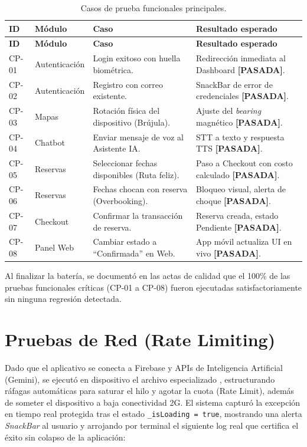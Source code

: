 \documentclass[12pt,letterpaper]{report}
\newcommand{\pathtext}[1]{\texttt{\detokenize{#1}}}
\begin{document}
\begin{longtable}{p{1.5cm}p{3.2cm}p{4.8cm}p{4.8cm}}
\caption{Casos de prueba funcionales principales.}\\
\toprule
\textbf{ID} & \textbf{Módulo} & \textbf{Caso} & \textbf{Resultado esperado}\\
\midrule
\endfirsthead
\toprule
\textbf{ID} & \textbf{Módulo} & \textbf{Caso} & \textbf{Resultado esperado}\\
\midrule
\endhead
CP-01 & Autenticación & Login exitoso con huella biométrica. & Redirección inmediata al Dashboard \textbf{[PASADA]}.\\
CP-02 & Autenticación & Registro con correo existente. & SnackBar de error de credenciales \textbf{[PASADA]}.\\
CP-03 & Mapas & Rotación física del dispositivo (Brújula). & Ajuste del \textit{bearing} magnético \textbf{[PASADA]}.\\
CP-04 & Chatbot & Enviar mensaje de voz al Asistente IA. & STT a texto y respuesta TTS \textbf{[PASADA]}.\\
CP-05 & Reservas & Seleccionar fechas disponibles (Ruta feliz). & Paso a Checkout con costo calculado \textbf{[PASADA]}.\\
CP-06 & Reservas & Fechas chocan con reserva (Overbooking). & Bloqueo visual, alerta de choque \textbf{[PASADA]}.\\
CP-07 & Checkout & Confirmar la transacción de reserva. & Reserva creada, estado Pendiente \textbf{[PASADA]}.\\
CP-08 & Panel Web & Cambiar estado a ``Confirmada'' en Web. & App móvil actualiza UI en vivo \textbf{[PASADA]}.\\
\bottomrule
\end{longtable}

Al finalizar la batería, se documentó en las actas de calidad que el 100\% de las pruebas funcionales críticas (CP-01 a CP-08) fueron ejecutadas satisfactoriamente sin ninguna regresión detectada.

\section{Pruebas de Red (Rate Limiting)}
Dado que el aplicativo se conecta a Firebase y APIs de Inteligencia Artificial (Gemini), se ejecutó en dispositivo el archivo especializado \pathtext{pruebas\_rate\_limit\_test.dart}, estructurando ráfagas automáticas para saturar el hilo y agotar la cuota (Rate Limit), además de someter el dispositivo a baja conectividad 2G. El sistema capturó la excepción en tiempo real protegida tras el estado \texttt{\_isLoading = true}, mostrando una alerta \textit{SnackBar} al usuario y arrojando por terminal el siguiente log real que certifica el éxito sin colapso de la aplicación:
\end{document}
